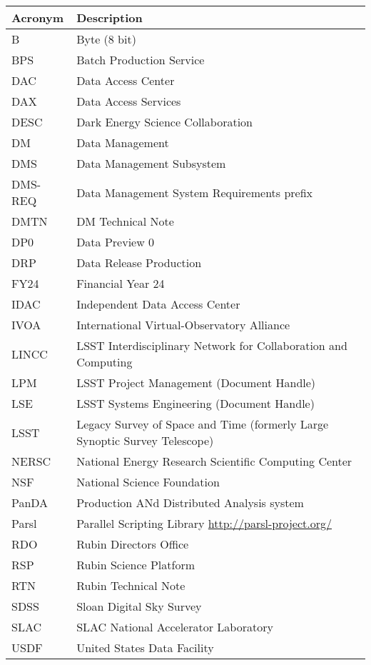 \addtocounter{table}{-1}
\begin{longtable}{p{}p{}}\hline
\textbf{Acronym} & \textbf{Description}  \\\hline

B & Byte (8 bit) \\\hline
BPS & Batch Production Service \\\hline
DAC & Data Access Center \\\hline
DAX & Data Access Services \\\hline
DESC & Dark Energy Science Collaboration \\\hline
DM & Data Management \\\hline
DMS & Data Management Subsystem \\\hline
DMS-REQ & Data Management System Requirements prefix \\\hline
DMTN & DM Technical Note \\\hline
DP0 & Data Preview 0 \\\hline
DRP & Data Release Production \\\hline
FY24 & Financial Year 24 \\\hline
IDAC & Independent Data Access Center \\\hline
IVOA & International Virtual-Observatory Alliance \\\hline
LINCC & LSST Interdisciplinary Network for Collaboration and Computing \\\hline
LPM & LSST Project Management (Document Handle) \\\hline
LSE & LSST Systems Engineering (Document Handle) \\\hline
LSST & Legacy Survey of Space and Time (formerly Large Synoptic Survey Telescope) \\\hline
NERSC & National Energy Research Scientific Computing Center \\\hline
NSF & National Science Foundation \\\hline
PanDA &  Production ANd Distributed Analysis system \\\hline
Parsl & Parallel Scripting Library \url{http://parsl-project.org/} \\\hline
RDO & Rubin Directors Office \\\hline
RSP & Rubin Science Platform \\\hline
RTN & Rubin Technical Note \\\hline
SDSS & Sloan Digital Sky Survey \\\hline
SLAC & SLAC National Accelerator Laboratory \\\hline
USDF & United States Data Facility \\\hline
\end{longtable}
